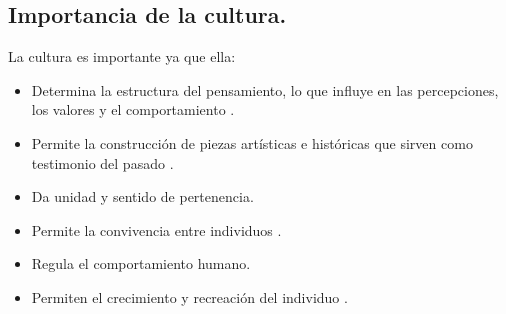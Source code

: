         \subsection{Importancia de la cultura.}\label{CulturaImpo}
        La cultura es importante ya que ella:
        \begin{itemize}
                \item Determina la estructura del pensamiento, lo que influye en 
                las percepciones, los valores y el comportamiento \cite{RefImporCul}.
                \item Permite la construcción de piezas artísticas e históricas 
                que sirven como testimonio del pasado \cite{RefImpoCulAr}.              
                \item Da unidad y sentido de pertenencia\cite{RefImpoUnidad}.
                \item Permite la convivencia entre individuos \cite{RefImporCul}.
                \item Regula el comportamiento humano\cite{RefImporCul}.
                 \item Permiten el crecimiento y recreación del individuo
                \cite{RefImpoCulAr}.
        \end{itemize}
